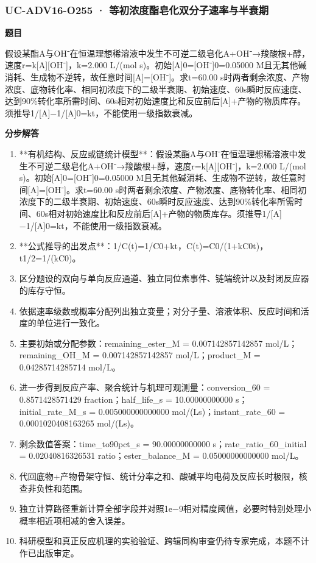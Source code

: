 \documentclass[UTF8,11pt,a4paper]{ctexart}
\begin{document}
\subsubsection*{UC-ADV16-O255 · 等初浓度酯皂化双分子速率与半衰期}
\noindent\textbf{题目}\par
假设某酯A与OH⁻在恒温理想稀溶液中发生不可逆二级皂化A+OH⁻→羧酸根+醇，速度r=k[A][OH⁻]，k=2.000 L/(mol s)。初始[A]0=[OH⁻]0=0.05000 M且无其他碱消耗、生成物不逆转，故任意时间[A]=[OH⁻]。求t=60.00 s时两者剩余浓度、产物浓度、底物转化率、相同初浓度下的二级半衰期、初始速度、60s瞬时反应速度、达到90\%转化率所需时间、60s相对初始速度比和反应前后[A]+产物的物质库存。须推导1/[A]−1/[A]0=kt，不能使用一级指数衰减。\par
\medskip\noindent\textbf{分步解答}
\begin{enumerate}
\item **有机结构、反应或链统计模型**：假设某酯A与OH⁻在恒温理想稀溶液中发生不可逆二级皂化A+OH⁻→羧酸根+醇，速度r=k[A][OH⁻]，k=2.000 L/(mol s)。初始[A]0=[OH⁻]0=0.05000 M且无其他碱消耗、生成物不逆转，故任意时间[A]=[OH⁻]。求t=60.00 s时两者剩余浓度、产物浓度、底物转化率、相同初浓度下的二级半衰期、初始速度、60s瞬时反应速度、达到90\%转化率所需时间、60s相对初始速度比和反应前后[A]+产物的物质库存。须推导1/[A]−1/[A]0=kt，不能使用一级指数衰减。
\item **公式推导的出发点**：1/C(t)=1/C0+kt，C(t)=C0/(1+kC0t)，t1/2=1/(kC0)。
\item 区分题设的双向与单向反应通道、独立同位素事件、链端统计以及封闭反应器的库存守恒。
\item 依据速率级数或概率分配列出独立变量；对分子量、溶液体积、反应时间和活度的单位进行一致化。
\item 主要初始或分配参数：remaining\_ester\_M = 0.007142857142857 mol/L；remaining\_OH\_M = 0.007142857142857 mol/L；product\_M = 0.04285714285714 mol/L。
\item 进一步得到反应产率、聚合统计与机理可观测量：conversion\_60 = 0.8571428571429 fraction；half\_life\_s = 10.00000000000 s；initial\_rate\_M\_s = 0.005000000000000 mol/(Ls)；instant\_rate\_60 = 0.0001020408163265 mol/(Ls)。
\item 剩余数值答案：time\_to90pct\_s = 90.00000000000 s；rate\_ratio\_60\_initial = 0.02040816326531 ratio；ester\_balance\_M = 0.05000000000000 mol/L。
\item 代回底物+产物骨架守恒、统计分率之和、酸碱平均电荷及反应长时极限，核查非负性和范围。
\item 独立计算路径重新计算全部字段并对照1e−9相对精度阈值，必要时特别处理小概率相近项相减的舍入误差。
\item 科研模型和真正反应机理的实验验证、跨辑同构审查仍待专家完成，本题不计作已出版审定。
\end{enumerate}
\end{document}
